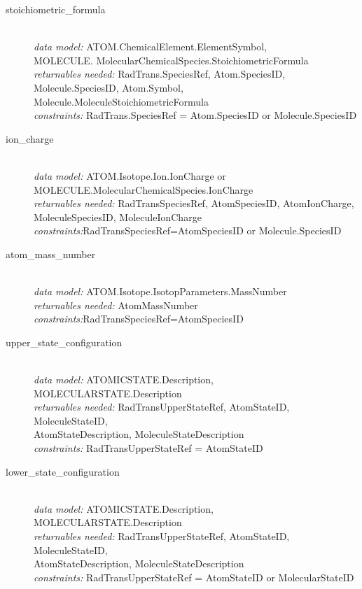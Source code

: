 \documentclass[11pt,a4paper]{ivoa}
\begin{document}
\begin{description}
\item [stoichiometric\_formula] \hfill\\
	\textit{data model:} ATOM.ChemicalElement.ElementSymbol,\\ MOLECULE. 
MolecularChemicalSpecies.StoichiometricFormula\\
	\textit{returnables needed:} RadTrans.SpeciesRef, Atom.SpeciesID, 
Molecule.SpeciesID, Atom.Symbol, Molecule.MoleculeStoichiometricFormula\\
	\textit{constraints:}  RadTrans.SpeciesRef = Atom.SpeciesID or  Molecule.SpeciesID

\item [ion\_charge]\hfill\\
	\textit{data model:} ATOM.Isotope.Ion.IonCharge or 
MOLECULE.MolecularChemicalSpecies.IonCharge \\
	\textit{returnables needed:} RadTransSpeciesRef, AtomSpeciesID, AtomIonCharge, 
MoleculeSpeciesID, MoleculeIonCharge \\
	\textit{constraints:}RadTransSpeciesRef=AtomSpeciesID or  Molecule.SpeciesID

	\item [atom\_mass\_number]\hfill\\
	\textit{data model:} ATOM.Isotope.IsotopParameters.MassNumber \\
	\textit{returnables needed:} AtomMassNumber\\
	\textit{constraints:}RadTransSpeciesRef=AtomSpeciesID

	\item [upper\_state\_configuration]\hfill\\
	\textit{data model:} ATOMICSTATE.Description, MOLECULARSTATE.Description\\
	\textit{returnables needed:} RadTransUpperStateRef, AtomStateID, 
MoleculeStateID,\\ 
AtomStateDescription, MoleculeStateDescription\\
	\textit{constraints:}  RadTransUpperStateRef = AtomStateID

	\item [lower\_state\_configuration]\hfill\\
	\textit{data model:} ATOMICSTATE.Description, MOLECULARSTATE.Description\\
	\textit{returnables needed:} RadTransUpperStateRef, AtomStateID, 
MoleculeStateID,\\ 
AtomStateDescription, MoleculeStateDescription\\
	\textit{constraints:}  RadTransUpperStateRef = AtomStateID or MolecularStateID
	

\end{description}
\end{document}
